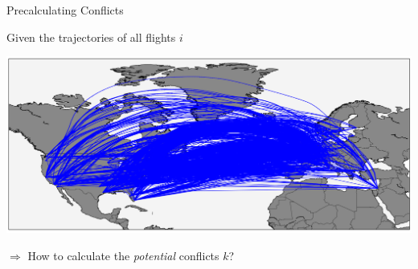 \documentclass[10pt]{beamer}
\begin{document}
\begin{frame}[t]{Precalculating Conflicts}
    \begin{minipage}[t]{0.4\linewidth}
        Given the trajectories of all flights $i$ 
    \end{minipage}
    \hfill
    \begin{minipage}[c]{0.5\linewidth}
        \includegraphics[width=1.0\textwidth]{images/wind_optimal_trajectories.png}
    \end{minipage}
    \vspace{1cm}
    \begin{center}
        $\Rightarrow$ How to calculate the \emph{potential} conflicts $k$?
    \end{center}
\end{frame}
\end{document}
